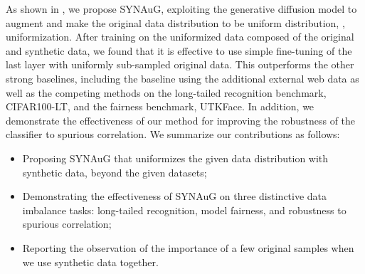 As shown in , we propose SYNAuG, exploiting the generative diffusion model to augment and make the original data distribution to be uniform distribution, \ie, uniformization.
After training on the uniformized data composed of the original and synthetic data, we found that it is effective to use simple fine-tuning of the last layer with uniformly sub-sampled original data.
This outperforms the other strong baselines, including the baseline using the additional external web data as well as the competing methods on the long-tailed recognition benchmark, CIFAR100-LT, and the fairness benchmark, UTKFace.
In addition, we demonstrate the effectiveness of our method for improving the robustness of the classifier to spurious correlation.
We summarize our contributions as follows:
\begin{itemize}
    \item Proposing SYNAuG that uniformizes the given data distribution with synthetic data, beyond the given datasets;\vspace{-1mm}
    \item Demonstrating the effectiveness of SYNAuG on three distinctive data imbalance tasks: long-tailed recognition, model fairness, and robustness to spurious correlation;
    \vspace{-1mm}
    \item Reporting the observation of the importance of a few original samples when we use synthetic data together.
\end{itemize}







